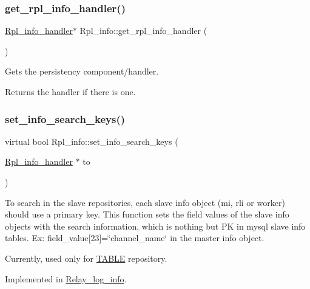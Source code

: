\subsubsection{\texorpdfstring{get\+\_\+rpl\+\_\+info\+\_\+handler()}{get\_rpl\_info\_handler()}}
{\footnotesize\ttfamily \mbox{\hyperlink{classRpl__info__handler}{Rpl\+\_\+info\+\_\+handler}}$\ast$ Rpl\+\_\+info\+::get\+\_\+rpl\+\_\+info\+\_\+handler (\begin{DoxyParamCaption}{ }\end{DoxyParamCaption})\hspace{0.3cm}{\ttfamily [inline]}}

Gets the persistency component/handler.

\begin{DoxyReturn}{Returns}
the handler if there is one. 
\end{DoxyReturn}
\mbox{\label{classRpl__info_a0b3b3cf032e7017f1760379364ff1738}} 
\subsubsection{\texorpdfstring{set\+\_\+info\+\_\+search\+\_\+keys()}{set\_info\_search\_keys()}}
{\footnotesize\ttfamily virtual bool Rpl\+\_\+info\+::set\+\_\+info\+\_\+search\+\_\+keys (\begin{DoxyParamCaption}\item[{\mbox{\hyperlink{classRpl__info__handler}{Rpl\+\_\+info\+\_\+handler}} $\ast$}]{to }\end{DoxyParamCaption})\hspace{0.3cm}{\ttfamily [pure virtual]}}

To search in the slave repositories, each slave info object (mi, rli or worker) should use a primary key. This function sets the field values of the slave info objects with the search information, which is nothing but PK in mysql slave info tables. Ex\+: field\+\_\+value\mbox{[}23\mbox{]}=\char`\"{}channel\+\_\+name\char`\"{} in the master info object.

Currently, used only for \mbox{\hyperlink{structTABLE}{T\+A\+B\+LE}} repository. 

Implemented in \mbox{\hyperlink{classRelay__log__info_a41736eb133d061e07653c5207d6913e0}{Relay\+\_\+log\+\_\+info}}.


